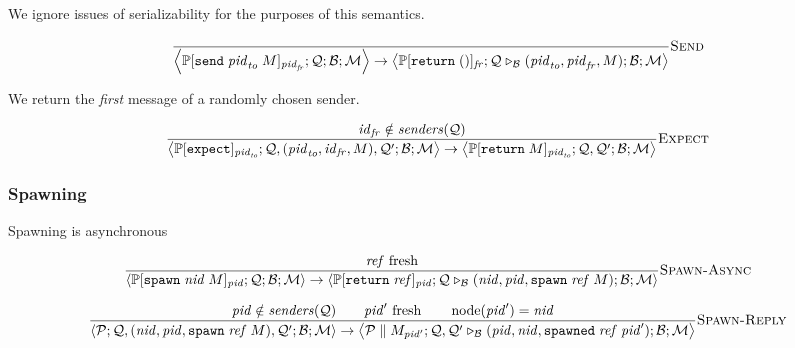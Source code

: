 \documentclass{article}
\newcommand{\sReturn}{\mathtt{return}}
\newcommand{\sExpect}{\mathtt{expect}}
\newcommand{\sSend}{\mathtt{send}}
\newcommand{\sSpawn}{\mathtt{spawn}}
\DeclareMathOperator{\sNodeOf}{node}
\newcommand{\sSpawned}{\mathtt{spawned}}
\newcommand{\sExtend}[1]{\mathrel{\triangleright_{#1}}}
\newcommand{\sPar}{\mathrel{\parallel}}
\newcommand{\sNid}{\ensuremath{\mathit{nid}}}
\newcommand{\sPid}{\ensuremath{\mathit{pid}}}
\newcommand{\sId}{\ensuremath{\mathit{id}}}
\newcommand{\sRef}{\ensuremath{\mathit{ref}}}
\newcommand{\sSystem}[4]{\left\langle #1 ; #2 ; #3 ; #4 \right\rangle}
\newcommand{\sQueue}{\mathcal{Q}}
\newcommand{\sProcesses}{\mathcal{P}}
\newcommand{\sBlacklist}{\mathcal{B}}
\newcommand{\sMonitors}{\mathcal{M}}
\newcommand{\sCtxt}[1]{\mathbb{#1}}
\newcommand{\sSenders}{\mathit{senders}}
\begin{document}
We ignore issues of serializability for the purposes of this semantics.

\begin{equation*}
\frac{
}{
  \sSystem{\sCtxt{P}[ \sSend \; \sPid_\mathit{to} \; M ]_{\sPid_\mathit{fr}}}
          {\sQueue}
          {\sBlacklist}
          {\sMonitors}
\rightarrow 
  \sSystem{\sCtxt{P}[ \sReturn \; () ]_\mathit{fr}}
          {\sQueue \sExtend{\sBlacklist} (\sPid_\mathit{to}, \sPid_\mathit{fr}, M)}
          {\sBlacklist}
          {\sMonitors}
} \textsc{Send}
\end{equation*}

We return the \emph{first} message of a randomly chosen sender.

\begin{equation*}
\frac{
  \sId_{\mathit{fr}} \notin \sSenders(\sQueue)
}{
  \sSystem{\sCtxt{P}[ \sExpect ]_{\sPid_\mathit{to}}}
          {\sQueue, (\sPid_\mathit{to}, \sId_\mathit{fr}, M), \sQueue'}
          {\sBlacklist}
          {\sMonitors}
\rightarrow
  \sSystem{\sCtxt{P}[ \sReturn \; M ]_{\sPid_\mathit{to}}}
          {\sQueue, \sQueue'}
          {\sBlacklist}
          {\sMonitors}
} \textsc{Expect}
\end{equation*}

\subsubsection{Spawning}

Spawning is asynchronous

\begin{equation*}
\frac{
  \sRef \text{ fresh} 
}{
  \sSystem{\sCtxt{P}[ \sSpawn \; \sNid \; M ]_\sPid}
          {\sQueue}
          {\sBlacklist}
          {\sMonitors}
\rightarrow          
  \sSystem{\sCtxt{P}[ \sReturn \; \sRef ]_\sPid}
          {\sQueue \sExtend{\sBlacklist} (\sNid, \sPid, \sSpawn \; \sRef \; M)}
          {\sBlacklist}
          {\sMonitors}
} \textsc{Spawn-Async}
\end{equation*}

\begin{equation*}
\frac{
  \sPid \notin \sSenders(\sQueue)
\qquad
  \sPid' \text{ fresh} 
\qquad
  \sNodeOf(\sPid') = \sNid
}{
  \sSystem{\sProcesses}
          {\sQueue, (\sNid, \sPid, \sSpawn \; \sRef \; M), \sQueue'}
          {\sBlacklist}
          {\sMonitors}
\rightarrow
  \sSystem{\sProcesses \sPar M_{\sPid'}}
          {\sQueue, \sQueue' \sExtend{\sBlacklist} (\sPid, \sNid, \sSpawned \; \sRef \; \sPid')}
          {\sBlacklist}
          {\sMonitors}
} \textsc{Spawn-Reply}
\end{equation*}
\end{document}
